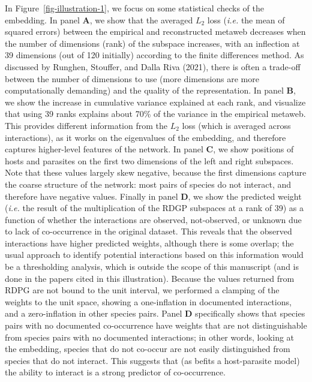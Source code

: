 \documentclass[
  letterpaper,
  DIV=11,
  numbers=noendperiod]{scrartcl}
\begin{document}
In Figure~\ref{fig-illustration-1}, we focus on some statistical checks
of the embedding. In panel \textbf{A}, we show that the averaged \(L_2\)
loss (\emph{i.e.} the mean of squared errors) between the empirical and
reconstructed metaweb decreases when the number of dimensions (rank) of
the subspace increases, with an inflection at 39 dimensions (out of 120
initially) according to the finite differences method. As discussed by
Runghen, Stouffer, and Dalla Riva (2021), there is often a trade-off
between the number of dimensions to use (more dimensions are more
computationally demanding) and the quality of the representation. In
panel \textbf{B}, we show the increase in cumulative variance explained
at each rank, and visualize that using 39 ranks explains about 70\% of
the variance in the empirical metaweb. This provides different
information from the \(L_2\) loss (which is averaged across
interactions), as it works on the eigenvalues of the embedding, and
therefore captures higher-level features of the network. In panel
\textbf{C}, we show positions of hosts and parasites on the first two
dimensions of the left and right subspaces. Note that these values
largely skew negative, because the first dimensions capture the coarse
structure of the network: most pairs of species do not interact, and
therefore have negative values. Finally in panel \textbf{D}, we show the
predicted weight (\emph{i.e.} the result of the multiplication of the
RDGP subspaces at a rank of 39) as a function of whether the
interactions are observed, not-observed, or unknown due to lack of
co-occurrence in the original dataset. This reveals that the observed
interactions have higher predicted weights, although there is some
overlap; the usual approach to identify potential interactions based on
this information would be a thresholding analysis, which is outside the
scope of this manuscript (and is done in the papers cited in this
illustration). Because the values returned from RDPG are not bound to
the unit interval, we performed a clamping of the weights to the unit
space, showing a one-inflation in documented interactions, and a
zero-inflation in other species pairs. Panel \textbf{D} specifically
shows that species pairs with no documented co-occurrence have weights
that are not distinguishable from species pairs with no documented
interactions; in other words, looking at the embedding, species that do
not co-occur are not easily distinguished from species that do not
interact. This suggests that (as befits a host-parasite model) the
ability to interact is a strong predictor of co-occurrence.
\end{document}
